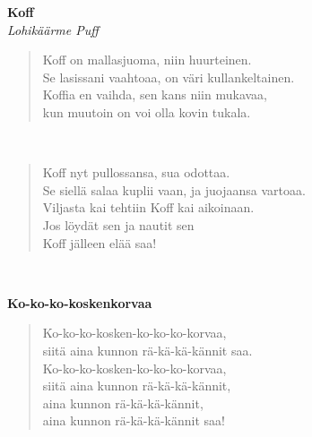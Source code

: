 \noindent\begin{minipage}{\linewidth}
\vspace{5pt}
\parbox[t]{0.85\linewidth}{\raggedright {\large\bf Koff}\\[2pt]\small\emph{Lohikäärme Puff}\\[6pt]}
\begin{verse}
	
	Koff on mallasjuoma, niin huurteinen.\\
	Se lasissani vaahtoaa, on väri kullankeltainen.\\
	Koffia en vaihda, sen kans niin mukavaa,\\
	kun muutoin on voi olla kovin tukala.\\
\end{verse}
\end{minipage}\\[10pt]
\noindent\begin{minipage}{\linewidth}
\begin{verse}
	Koff nyt pullossansa, sua odottaa.\\
	Se siellä salaa kuplii vaan, ja juojaansa vartoaa.\\
	Viljasta kai tehtiin Koff kai aikoinaan.\\
	Jos löydät sen ja nautit sen\\
	Koff jälleen elää saa!\\
\end{verse}
\end{minipage}\\[10pt]
%
%
\noindent\begin{minipage}{\linewidth}
\vspace{5pt}
\parbox[t]{0.85\linewidth}{\raggedright {\large\bf Ko-ko-ko-koskenkorvaa}\\[6pt]}
\begin{verse}
	Ko-ko-ko-kosken-ko-ko-ko-korvaa,\\
	siitä aina kunnon rä-kä-kä-kännit saa.\\
	Ko-ko-ko-kosken-ko-ko-ko-korvaa,\\
	siitä aina kunnon rä-kä-kä-kännit,\\
	aina kunnon rä-kä-kä-kännit,\\
	aina kunnon rä-kä-kä-kännit saa!\\
\end{verse}
\end{minipage}\\[10pt]
